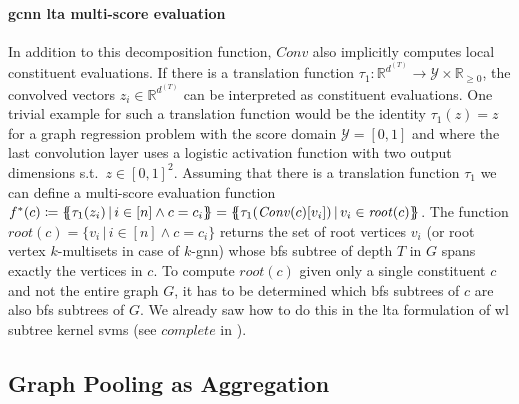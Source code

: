 \paragraph{\ac{gcnn} \ac{lta} multi-score evaluation}
In addition to this decomposition function, $\mathit{Conv}$ also implicitly computes local constituent evaluations.
If there is a translation function $\tau_{1}: \mathbb{R}^{d^{(T)}} \to \mathcal{Y} \times \mathbb{R}_{\geq 0}$, the convolved vectors $z_i \in \mathbb{R}^{d^{(T)}}$ can be interpreted as constituent evaluations.
One trivial example for such a translation function would be the identity $\tau_{1}(z) = z$ for a graph regression problem with the score domain $\mathcal{Y} = [0, 1]$ and where the last convolution layer uses a logistic activation function with two output dimensions s.t.\ $z \in {[0,1]}^2$.
Assuming that there is a translation function $\tau_{1}$ we can define a multi-score evaluation function $f^{*}(c) \coloneqq {\ldblbrace \tau_{1}(z_i)\, |\, {i \in [n]} \land {c = c_i} \rdblbrace} = {\ldblbrace \tau_{1}(\mathit{Conv}(c)[v_i])\, |\, v_i \in \mathit{root}(c) \rdblbrace}$.
The function $\mathit{root}(c) = \{ v_i\, |\, {i \in [n]} \land {c = c_i} \}$ returns the set of root vertices $v_i$ (or root vertex $k$-multisets in case of $k$-\acs{gnn}) whose \ac{bfs} subtree of depth $T$ in $G$ spans exactly the vertices in $c$.
To compute $\mathit{root}(c)$ given only a single constituent $c$ and not the entire graph $G$, it has to be determined which \ac{bfs} subtrees of $c$ are also \ac{bfs} subtrees of $G$.
We already saw how to do this in the \ac{lta} formulation of \ac{wl} subtree kernel \acp{svm} (see $\mathit{complete}$ in ).

\subsection{Graph Pooling as Aggregation}%
\label{sec:ltag:formulation:gcnn:pool}

